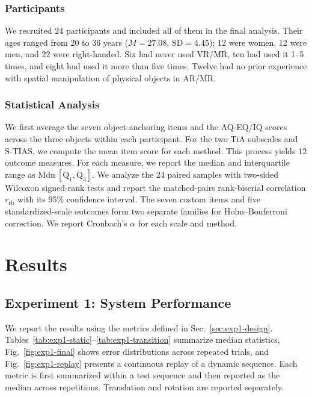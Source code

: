 \documentclass[review]{vgtc}
\begin{document}
\subsubsection{Participants}

We recruited 24 participants and included all of them in the final analysis. Their ages ranged from 20 to 36 years ($M=27.08$, $\mathrm{SD}=4.45$); 12 were women, 12 were men, and 22 were right-handed. Six had never used VR/MR, ten had used it 1--5 times, and eight had used it more than five times. Twelve had no prior experience with spatial manipulation of physical objects in AR/MR.

\subsubsection{Statistical Analysis}

We first average the seven object-anchoring items and the AQ-EQ/IQ scores across the three objects within each participant. For the two TiA subscales and S-TIAS, we compute the mean item score for each method. This process yields 12 outcome measures. For each measure, we report the median and interquartile range as $\mathrm{Mdn}\ [\mathrm{Q}_1, \mathrm{Q}_3]$. We analyze the 24 paired samples with two-sided Wilcoxon signed-rank tests and report the matched-pairs rank-biserial correlation $r_{\mathrm{rb}}$ with its 95\% confidence interval. The seven custom items and five standardized-scale outcomes form two separate families for Holm--Bonferroni correction. We report Cronbach's $\alpha$ for each scale and method.

\section{Results}\label{sec:results}

\subsection{Experiment 1: System Performance}

We report the results using the metrics defined in Sec.~\ref{sec:exp1-design}. Tables~\ref{tab:exp1-static}--\ref{tab:exp1-transition} summarize median statistics, Fig.~\ref{fig:exp1-final} shows error distributions across repeated trials, and Fig.~\ref{fig:exp1-replay} presents a continuous replay of a dynamic sequence. Each metric is first summarized within a test sequence and then reported as the median across repetitions. Translation and rotation are reported separately.
\end{document}
